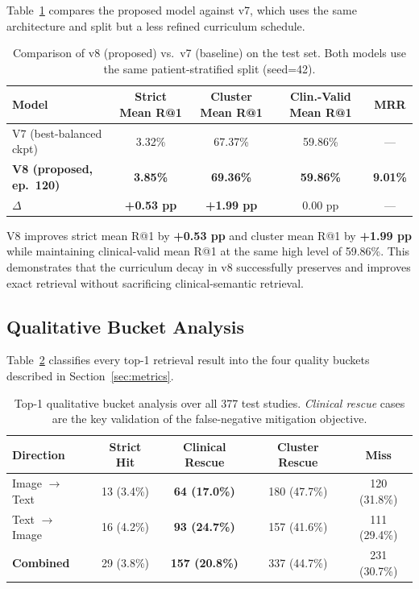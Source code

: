 \documentclass[11pt, a4paper]{article}
\begin{document}
Table~\ref{tab:comparison} compares the proposed model against v7, which
uses the same architecture and split but a less refined curriculum schedule.

\begin{table}[H]
  \centering
  \caption{Comparison of v8 (proposed) vs.\ v7 (baseline) on the test set.
    Both models use the same patient-stratified split (seed=42).}
  \label{tab:comparison}
  \renewcommand{\arraystretch}{1.1}
  \begin{tabular}{lcccc}
    \toprule
    \textbf{Model} &
    \textbf{Strict Mean R@1} &
    \textbf{Cluster Mean R@1} &
    \textbf{Clin.-Valid Mean R@1} &
    \textbf{MRR} \\
    \midrule
    V7 (best-balanced ckpt) & 3.32\% & 67.37\% & 59.86\% & --- \\
    \textbf{V8 (proposed, ep.~120)} & \textbf{3.85\%} & \textbf{69.36\%} & \textbf{59.86\%} & \textbf{9.01\%} \\
    \midrule
    $\Delta$ & \textbf{+0.53 pp} & \textbf{+1.99 pp} & 0.00 pp & --- \\
    \bottomrule
  \end{tabular}
\end{table}

V8 improves strict mean R@1 by \textbf{+0.53 pp} and cluster mean R@1 by
\textbf{+1.99 pp} while maintaining clinical-valid mean R@1 at the same
high level of 59.86\%.
This demonstrates that the curriculum decay in v8 successfully preserves
and improves exact retrieval without sacrificing clinical-semantic retrieval.

\subsection{Qualitative Bucket Analysis}

Table~\ref{tab:bucket} classifies every top-1 retrieval result into the
four quality buckets described in Section~\ref{sec:metrics}.

\begin{table}[H]
  \centering
  \caption{Top-1 qualitative bucket analysis over all 377 test studies.
    \emph{Clinical rescue} cases are the key validation of the
    false-negative mitigation objective.}
  \label{tab:bucket}
  \renewcommand{\arraystretch}{1.1}
  \begin{tabular}{lcccc}
    \toprule
    \textbf{Direction} &
    \textbf{Strict Hit} &
    \textbf{Clinical Rescue} &
    \textbf{Cluster Rescue} &
    \textbf{Miss} \\
    \midrule
    Image $\to$ Text & 13 (3.4\%)  & \textbf{64 (17.0\%)}  & 180 (47.7\%) & 120 (31.8\%) \\
    Text $\to$ Image & 16 (4.2\%)  & \textbf{93 (24.7\%)} & 157 (41.6\%) & 111 (29.4\%) \\
    \midrule
    \textbf{Combined} & 29 (3.8\%) & \textbf{157 (20.8\%)} & 337 (44.7\%) & 231 (30.7\%) \\
    \bottomrule
  \end{tabular}
\end{table}
\end{document}
